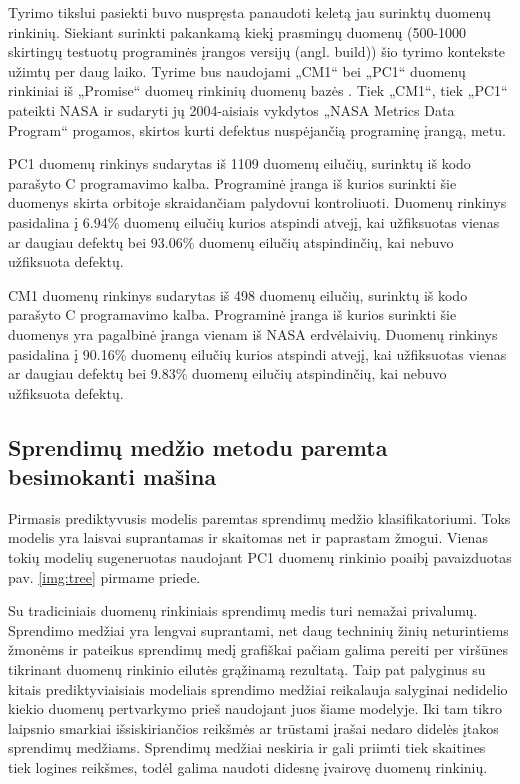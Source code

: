 \documentclass{VUMIFPSbakalaurinis}
\begin{document}
Tyrimo tikslui pasiekti buvo nuspręsta panaudoti keletą jau surinktų duomenų rinkinių. Siekiant surinkti pakankamą kiekį prasmingų duomenų (500-1000 skirtingų testuotų programinės įrangos versijų (angl. build)) šio tyrimo kontekste užimtų per daug laiko. Tyrime bus naudojami  „CM1“ bei „PC1“ duomenų rinkiniai iš  „Promise“ duomeų rinkinių duomenų bazės \cite{Sayyad-Shirabad+Menzies:2005}. Tiek „CM1“, tiek „PC1“ pateikti NASA ir sudaryti jų 2004-aisiais vykdytos „NASA Metrics Data Program“ progamos, skirtos kurti defektus nuspėjančią programinę įrangą, metu.

PC1 duomenų rinkinys sudarytas iš 1109 duomenų eilučių, surinktų iš kodo parašyto C programavimo kalba. Programinė įranga iš kurios surinkti šie duomenys skirta orbitoje skraidančiam palydovui kontroliuoti. Duomenų rinkinys pasidalina į 6.94\% duomenų eilučių kurios atspindi atvejį, kai užfiksuotas vienas ar daugiau defektų bei 93.06\% duomenų eilučių atspindinčių, kai nebuvo užfiksuota defektų.

CM1 duomenų rinkinys sudarytas iš 498 duomenų eilučių, surinktų iš kodo parašyto C programavimo kalba. Programinė įranga iš kurios surinkti šie duomenys yra pagalbinė įranga vienam iš NASA erdvėlaivių. Duomenų rinkinys pasidalina į 90.16\% duomenų eilučių kurios atspindi atvejį, kai užfiksuotas vienas ar daugiau defektų bei 9.83\% duomenų eilučių atspindinčių, kai nebuvo užfiksuota defektų.

\subsection{Sprendimų medžio metodu paremta besimokanti mašina}
Pirmasis prediktyvusis modelis paremtas sprendimų medžio klasifikatoriumi. Toks modelis yra laisvai suprantamas ir skaitomas net ir paprastam žmogui. Vienas tokių modelių sugeneruotas naudojant PC1 duomenų rinkinio poaibį pavaizduotas pav. \ref{img:tree} pirmame priede. 

Su tradiciniais duomenų rinkiniais sprendimų medis turi nemažai privalumų. Sprendimo medžiai yra lengvai suprantami, net daug techninių žinių neturintiems žmonėms ir pateikus sprendimų medį grafiškai pačiam galima pereiti per viršūnes tikrinant duomenų rinkinio eilutės grąžinamą rezultatą. Taip pat palyginus su kitais prediktyviaisiais modeliais sprendimo medžiai reikalauja salyginai nedidelio kiekio duomenų pertvarkymo prieš naudojant juos šiame modelyje. Iki tam tikro laipsnio smarkiai išsiskiriančios reikšmės ar trūstami įrašai nedaro didelės įtakos sprendimų medžiams. Sprendimų medžiai neskiria ir gali priimti tiek skaitines tiek logines reikšmes, todėl galima naudoti didesnę įvairovę duomenų rinkinių.
\end{document}
